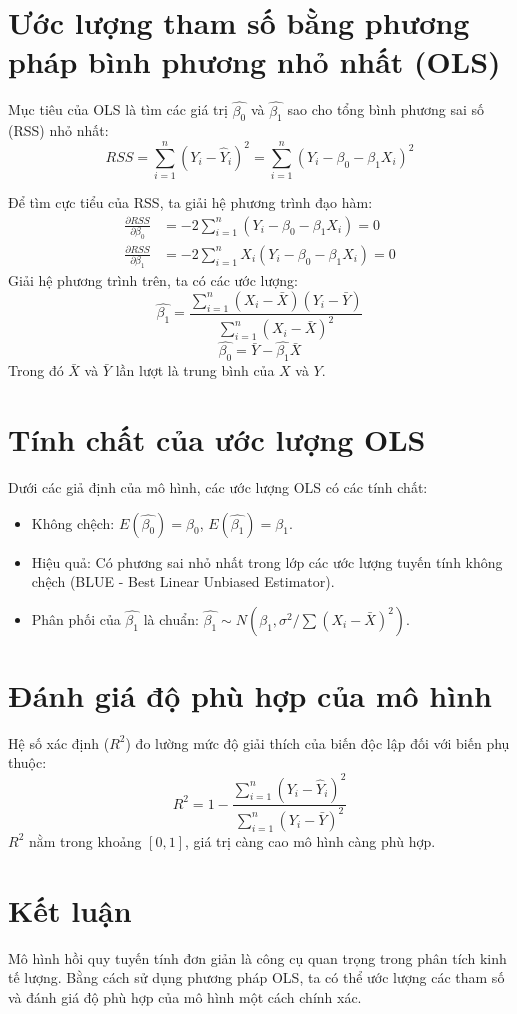 \section{Ước lượng tham số bằng phương pháp bình phương nhỏ nhất (OLS)}
Mục tiêu của OLS là tìm các giá trị $\hat{\beta_0}$ và $\hat{\beta_1}$ sao cho tổng bình phương sai số (RSS) nhỏ nhất:
\begin{equation}
    RSS = \sum_{i=1}^{n} (Y_i - \hat{Y}_i)^2 = \sum_{i=1}^{n} (Y_i - \beta_0 - \beta_1 X_i)^2
\end{equation}

Để tìm cực tiểu của RSS, ta giải hệ phương trình đạo hàm:
\begin{align}
    \frac{\partial RSS}{\partial \beta_0} &= -2\sum_{i=1}^{n} (Y_i - \beta_0 - \beta_1 X_i) = 0 \\
    \frac{\partial RSS}{\partial \beta_1} &= -2\sum_{i=1}^{n} X_i (Y_i - \beta_0 - \beta_1 X_i) = 0
\end{align}
Giải hệ phương trình trên, ta có các ước lượng:
\begin{equation}
    \hat{\beta_1} = \frac{\sum_{i=1}^{n} (X_i - \bar{X})(Y_i - \bar{Y})}{\sum_{i=1}^{n} (X_i - \bar{X})^2}
\end{equation}
\begin{equation}
    \hat{\beta_0} = \bar{Y} - \hat{\beta_1} \bar{X}
\end{equation}
Trong đó $\bar{X}$ và $\bar{Y}$ lần lượt là trung bình của $X$ và $Y$.

\section{Tính chất của ước lượng OLS}
Dưới các giả định của mô hình, các ước lượng OLS có các tính chất:
\begin{itemize}
    \item Không chệch: $E(\hat{\beta_0}) = \beta_0$, $E(\hat{\beta_1}) = \beta_1$.
    \item Hiệu quả: Có phương sai nhỏ nhất trong lớp các ước lượng tuyến tính không chệch (BLUE - Best Linear Unbiased Estimator).
    \item Phân phối của $\hat{\beta_1}$ là chuẩn: $\hat{\beta_1} \sim N(\beta_1, \sigma^2 / \sum (X_i - \bar{X})^2)$.
\end{itemize}

\section{Đánh giá độ phù hợp của mô hình}
Hệ số xác định ($R^2$) đo lường mức độ giải thích của biến độc lập đối với biến phụ thuộc:
\begin{equation}
    R^2 = 1 - \frac{\sum_{i=1}^{n} (Y_i - \hat{Y}_i)^2}{\sum_{i=1}^{n} (Y_i - \bar{Y})^2}
\end{equation}
$R^2$ nằm trong khoảng $[0,1]$, giá trị càng cao mô hình càng phù hợp.

\section{Kết luận}
Mô hình hồi quy tuyến tính đơn giản là công cụ quan trọng trong phân tích kinh tế lượng. Bằng cách sử dụng phương pháp OLS, ta có thể ước lượng các tham số và đánh giá độ phù hợp của mô hình một cách chính xác.
